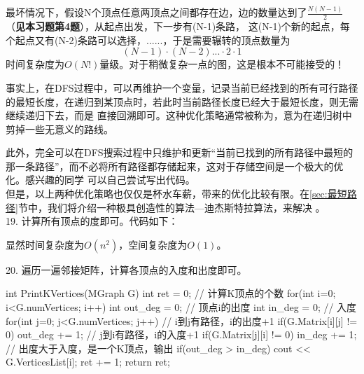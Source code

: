 \begin{exerciseanswer}
最坏情况下，假设N个顶点任意两顶点之间都存在边，边的数量达到了$ \frac{N(N-1)}{2} $（{\color{red}\textbf{见本习题第4题}}），从起点出发，下一步有(N-1)条路，
这(N-1)个新的起点，每个起点又有(N-2)条路可以选择，......，于是需要辗转的顶点数量为
\[
    (N-1)\cdot (N-2)... \cdot 2 \cdot 1
\]
时间复杂度为$O(N!)$量级。对于稍微复杂一点的图，这是根本不可能接受的！

事实上，在DFS过程中，可以再维护一个变量，记录当前已经找到的所有可行路径的最短长度，在递归到某顶点时，若此时当前路径长度已经大于最短长度，则无需继续递归下去，而是
直接回溯即可。这种优化策略通常被称为，意为在递归树中剪掉一些无意义的路线。

此外，完全可以在DFS搜索过程中只维护和更新“当前已找到的所有路径中最短的那一条路径”，而不必将所有路径都存储起来，这对于存储空间是一个极大的优化。感兴趣的同学
可以自己尝试写出代码。\\

但是，以上两种优化策略也仅仅是杯水车薪，带来的优化比较有限。在\ref{sec:最短路径}节中，我们将介绍一种极具创造性的算法---迪杰斯特拉算法，来解决
。\\

19. 计算所有顶点的度即可。代码如下：
显然时间复杂度为$O(n^2)$，空间复杂度为$O(1)$。

\vspace{\baselineskip}

20. 遍历一遍邻接矩阵，计算各顶点的入度和出度即可。
\begin{cppcode}
    int PrintKVertices(MGraph G) {
        int ret = 0;    // 计算K顶点的个数
        for(int i=0; i<G.numVertices; i++) {
            int out_deg = 0;    // 顶点i的出度
            int in_deg = 0;     // 入度
            for(int j=0; j<G.numVertices; j++) {
                // i到j有路径，i的出度+1
                if(G.Matrix[i][j] != 0) out_deg += 1;   
                // j到i有路径，i的入度+1
                if(G.Matrix[j][i] != 0) in_deg += 1;    
            }
            // 出度大于入度，是一个K顶点，输出
            if(out_deg > in_deg) {
                cout << G.VerticesList[i];
                ret += 1;
            }
        }
        return ret;
    }
\end{cppcode}

\end{exerciseanswer}%